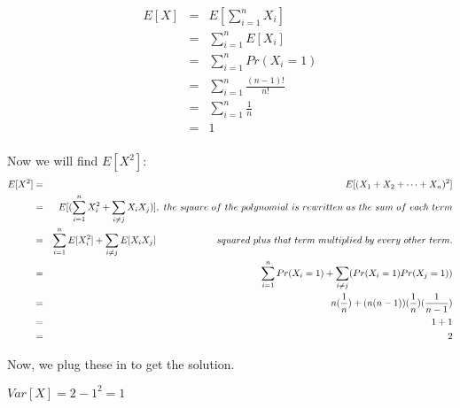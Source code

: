 \documentclass{article}
\begin{document}
\begin{eqnarray*}
    E[X] & = & E[ \sum_{i=1}^n X_i ] \\
         & = & \sum_{i=1}^n E[ X_i ] \\
         & = & \sum_{i=1}^n Pr(X_i = 1) \\
         & = & \sum_{i=1}^n \frac{(n-1)!}{n!} \\
         & = & \sum_{i=1}^n \frac{1}{n} \\
         & = & 1 \\
\end{eqnarray*}

Now we will find ${E[X^2]}$: \\

\begin{eqnarray*}
    E[X^2] & = & E[ (X_1 + X_2 + \dots + X_{n})^2 ] \\
           & = & E[ (\sum_{i=1}^n X_i^2 + \sum_{i\neq j} X_iX_{j} ) ], \  the\ square\ of\ the\ polynomial\ is\ rewritten\ as\ the\ sum\ of\ each\ term\\ 
           & = & \sum_{i=1}^n E[X_i^2] + \sum_{i\neq j} E[X_iX_{j}] \hspace{15ex} squared\ plus\ that\ term\ multiplied\ by\ every\ other\ term. \\
           & = & \sum_{i=1}^n Pr(X_i = 1) + \sum_{i\neq j} ( Pr(X_i = 1) Pr(X_{j} = 1) )  \\
           & = & n ( \frac{1}{n} ) + ( n(n-1)) (\frac{1}{n}) (\frac{1}{n-1}) \\
           & = & 1 + 1 \\
           & = & 2 \\
\end{eqnarray*}

Now, we plug these in to get the solution. \\

\begin{center}
    ${\boxed{Var[X] = 2 - 1^2 = 1 } }$ \\
\end{center}
\end{document}
